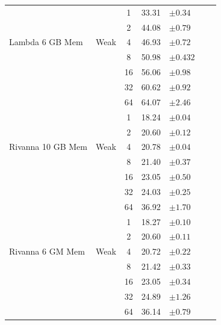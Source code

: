 \documentclass[conference]{IEEEtran}
\begin{document}
\begin{table}
\begin{tabular}{llcr @{\hspace{1\tabcolsep}} lr @{\hspace{1\tabcolsep}} l}
		\cmidrule{2-5}
    	\multirow{5}{*}{Lambda 6 GB Mem} &
		\multirow{5}{*}{Weak} &
		1                       &
		33.31 & $\pm0.34$     \\
		&
		                     &
		2                     &
		44.08 & $\pm0.79$   \\
		&
		                   &
		4                     &
		46.93 & $\pm0.72$    \\
		                    & &
		8                     &
		50.98 & $\pm0.432$      \\
		                    & &
		16                     &
		56.06 & $\pm0.98$      \\
& &
		32                     &
		60.62 & $\pm0.92$      \\
        & &
		64                     &
		64.07 & $\pm2.46$      \\
        \cmidrule{2-5}
    	\multirow{5}{*}{Rivanna 10 GB Mem} &
		\multirow{5}{*}{Weak} &
		1                       &
		18.24 & $\pm0.04$     \\
		&
		                     &
		2                     &
		20.60 & $\pm0.12$   \\
		&
		                   &
		4                     &
		20.78 & $\pm0.04$    \\
		                    & &
		8                     &
		21.40 & $\pm0.37$      \\
		                    & &
		16                     &
		23.05 & $\pm0.50$      \\
                            & &
		32                     &
		24.03 & $\pm0.25$      \\
                            & &
		64                     &
		36.92 & $\pm1.70$      \\
        
        \cmidrule{2-5}
    	\multirow{5}{*}{Rivanna 6 GM Mem} &
		\multirow{5}{*}{Weak} &
		1                       &
		18.27 & $\pm0.10$     \\
		&
		                     &
		2                     &
		20.60 & $\pm0.11$   \\
		&
		                   &
		4                     &
		20.72 & $\pm0.22$    \\
		                    & &
		8                     &
		21.42 & $\pm0.33$      \\
		                    & &
		16                     &
		23.05 & $\pm0.34$      \\
                            & &
		32                     &
		24.89 & $\pm1.26$      \\
                            & &
		64                     &
		36.14 & $\pm0.79$      \\
		\bottomrule
	\end{tabular}
\end{table}
\end{document}
